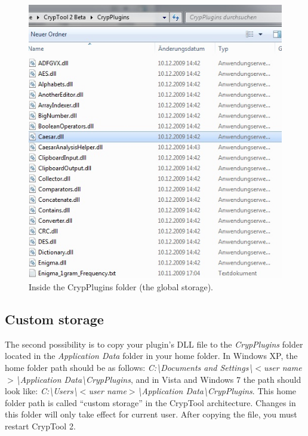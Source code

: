 \begin{figure}[h]
	\centering
		\includegraphics{figures/global_storage.jpg}
	\caption{Inside the CrypPlugins folder (the global storage).}
	\label{fig:global_storage}
\end{figure}

\subsection{Custom storage}
\label{sec:CustomStorage}

The second possibility is to copy your plugin's DLL file to the \textit{CrypPlugins} folder located in the \textit{Application Data} folder in your home folder. In Windows XP, the home folder path should be as follows: \textit{C:\textbackslash Documents and Settings\textbackslash $<$user name$>$\textbackslash Application Data\textbackslash CrypPlugins}, and in Vista and Windows 7 the path should look like: \textit{C:\textbackslash Users\textbackslash $<$user name$>$\textbackslash Application Data\textbackslash CrypPlugins}. This home folder path is called ``custom storage'' in the CrypTool architecture. Changes in this folder will only take effect for current user. After copying the file, you must restart CrypTool 2.
\clearpage

